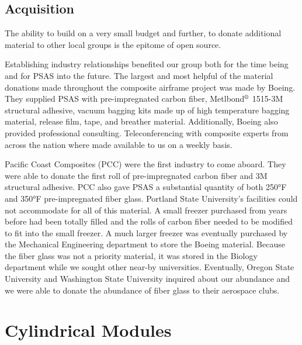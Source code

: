 \documentclass{aiaa-tc}%
\newcommand{\mathregistered}{\text{\textregistered}}
\begin{document}
\subsection{Acquisition}
The ability to build on a very small budget and further, to donate additional material to other local groups is the epitome of open source. 

Establishing industry relationships benefited our group both for the time being and for PSAS into the future. The largest and most helpful of the material donations made throughout the composite airframe project was made by Boeing. They supplied PSAS with pre-impregnated carbon fiber, Metlbond$^\mathregistered$ 1515-3M structural adhesive, vacuum bagging kits made up of high temperature bagging material, release film, tape, and breather material. Additionally, Boeing also provided professional consulting. Teleconferencing with composite experts from across the nation where made available to us on a weekly basis.  

Pacific Coast Composites (PCC) were the first industry to come aboard. They were able to donate the first roll of pre-impregnated carbon fiber and 3M structural adhesive. PCC also gave PSAS a substantial quantity of both 250°F and 350°F pre-impregnated fiber glass. Portland State University's facilities could not accommodate for all of this material. A small freezer purchased from years before had been totally filled and the rolls of carbon fiber needed to be modified to fit into the small freezer. A much larger freezer was eventually purchased by the Mechanical Engineering department to store the Boeing material. Because the fiber glass was not a priority material, it was stored in the Biology department while we sought other near-by universities. Eventually, Oregon State University and Washington State University inquired about our abundance and we were able to donate the abundance of fiber glass to their aerospace clubs. 


\section{Cylindrical Modules}
\end{document}
